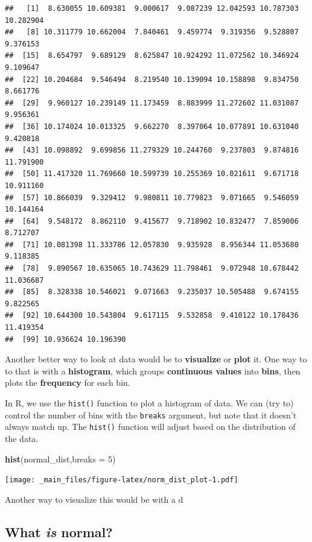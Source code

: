\documentclass[
]{book}
\newenvironment{Shaded}{\begin{snugshade}}{\end{snugshade}}
\newcommand{\AttributeTok}[1]{\textcolor[rgb]{0.13,0.29,0.53}{#1}}
\newcommand{\DecValTok}[1]{\textcolor[rgb]{0.00,0.00,0.81}{#1}}
\newcommand{\FunctionTok}[1]{\textcolor[rgb]{0.13,0.29,0.53}{\textbf{#1}}}
\newcommand{\NormalTok}[1]{#1}
\begin{document}
\begin{verbatim}
##   [1]  8.630055 10.609381  9.000617  9.087239 12.042593 10.787303 10.282904
##   [8] 10.311779 10.662004  7.840461  9.459774  9.319356  9.528807  9.376153
##  [15]  8.654797  9.689129  8.625847 10.924292 11.072562 10.346924  9.109647
##  [22] 10.204684  9.546494  8.219540 10.139094 10.158898  9.834750  8.661776
##  [29]  9.960127 10.239149 11.173459  8.883999 11.272602 11.031087  9.956361
##  [36] 10.174024 10.013325  9.662270  8.397064 10.077891 10.631040  9.420818
##  [43] 10.098892  9.699856 11.279329 10.244760  9.237803  9.874816 11.791900
##  [50] 11.417320 11.769660 10.599739 10.255369 10.021611  9.671718 10.911160
##  [57] 10.866039  9.329412  9.980811 10.779823  9.071665  9.546059 10.144164
##  [64]  9.548172  8.862110  9.415677  9.718902 10.832477  7.859006  8.712707
##  [71] 10.081398 11.333786 12.057830  9.935928  8.956344 11.053680  9.118385
##  [78]  9.890567 10.635065 10.743629 11.798461  9.072948 10.678442 11.036687
##  [85]  8.328338 10.546021  9.071663  9.235037 10.505488  9.674155  9.822565
##  [92] 10.644300 10.543804  9.617115  9.532858  9.410122 10.178436 11.419354
##  [99] 10.936624 10.196390
\end{verbatim}

Another better way to look at data would be to \textbf{visualize} or \textbf{plot} it. One way to to that is with a \textbf{histogram}, which groups \textbf{continuous values} into \textbf{bins}, then plots the \textbf{frequency} for each bin.

In R, we use the \texttt{hist()} function to plot a histogram of data. We can (try to) control the number of bins with the \texttt{breaks} argument, but note that it doesn't always match up. The \texttt{hist()} function will adjust based on the distribution of the data.

\begin{Shaded}
\begin{Highlighting}[]
\FunctionTok{hist}\NormalTok{(normal\_dist,}\AttributeTok{breaks =} \DecValTok{5}\NormalTok{)}
\end{Highlighting}
\end{Shaded}

\texttt{[image: \_main\_files/figure-latex/norm\_dist\_plot-1.pdf]}

Another way to visualize this would be with a d

\hypertarget{what-is-normal}{%
\subsection{\texorpdfstring{What \emph{is} normal?}{What is normal?}}\label{what-is-normal}}
\end{document}
